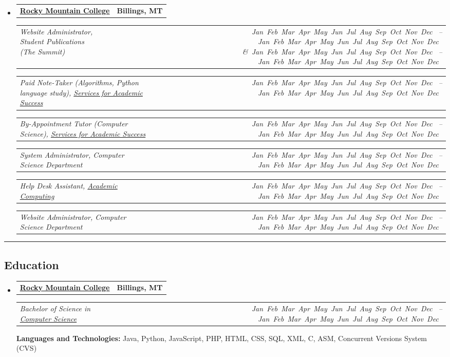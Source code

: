 \documentclass[9pt,letterpaper]{extarticle}
\makeatletter
\newcommand{\headerrow}[2]
{\begin{tabular*}{\linewidth}{l@{\extracolsep{\fill}}r}
	#1 &
	#2 \\
\end{tabular*}}
\newcommand{\DatestampYM}[2]{\mbox{\ShortMonth{#2}#1}}
\newcommand{\ShortMonth}[1]{
\ifcase#1\relax
\or Jan
\or Feb
\or Mar
\or Apr
\or May
\or Jun
\or Jul
\or Aug
\or Sep
\or Oct
\or Nov
\or Dec
\fi}
\makeatother
\begin{document}
\begin{itemize}
	\item
	\headerrow
		{\textbf{\href{http://www.rocky.edu}{Rocky Mountain College}}}
		{\textbf{Billings, MT}}
	\headerrow
		{\emph{Website Administrator, Student Publications (The Summit)}}
		{\emph{\DatestampYM{2013}{01} --\DatestampYM{2013}{05} \&\DatestampYM{2014}{01} --\DatestampYM{2014}{05}}}
	\headerrow
		{\emph{Paid Note-Taker (Algorithms, Python language study), \href{https://www.rocky.edu/academics/academic-support/services-academic-success}{Services for Academic Success}}}
		{\emph{\DatestampYM{2013}{09} --\DatestampYM{2013}{12}}}
	\headerrow
		{\emph{By-Appointment Tutor (Computer Science), \href{https://www.rocky.edu/academics/academic-support/services-academic-success}{Services for Academic Success}}}
		{\emph{\DatestampYM{2012}{09} --\DatestampYM{2014}{05}}}
	\headerrow
		{\emph{System Administrator, Computer Science Department}}
		{\emph{\DatestampYM{2012}{03} --\DatestampYM{2014}{05}}}
	\headerrow
		{\emph{Help Desk Assistant, \href{https://www.rocky.edu/resources/offices-departments/academic-computing}{Academic Computing}}}
		{\emph{\DatestampYM{2011}{09} --\DatestampYM{2013}{05}}}
	\headerrow
		{\emph{Website Administrator, Computer Science Department}}
		{\emph{\DatestampYM{2010}{09} --\DatestampYM{2011}{05}}}
\end{itemize}


\hrule
\vspace{-0.5em}
\subsection*{Education}

\begin{itemize}
	\parskip=0.1em

	\item
	\headerrow
		{\textbf{\href{http://www.rocky.edu/}{Rocky Mountain College}}}
		{\textbf{Billings, MT}}
	\headerrow
		{\emph{Bachelor of Science in \href{http://cs.rocky.edu/}{Computer Science}}}
		{\emph{\DatestampYM{2010}{08} --\DatestampYM{2014}{05}}}
	\textbf{Languages and Technologies:} Java, Python, JavaScript, PHP, HTML, CSS, SQL, XML, C, ASM, Concurrent Versions System (CVS)
\end{itemize}
\end{document}
